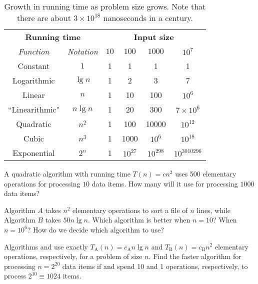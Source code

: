 \begin{table}[htb] 
   \centering
   \caption{Growth in running time as problem size grows. Note that 
   there are about $3\times 10^{18}$ nanoseconds in a century.}
   \label{t:growth}
   \begin{tabular}{|c|c|cccc|} \hline 
   \multicolumn{2}{|c|}{\textbf{Running time}} &  
   \multicolumn{4}{c|}{\textbf{Input size}} 
\\ \cline{1-6} 
   \emph{Function}     & \emph{Notation} & $10$ & $100$ & $1000$ & $10^7$
\\ \hline 
   Constant     & $1$      & 1  & 1  &   1 &   1 \\ \hline 
   Logarithmic  & $\lg n$ & 1  & 2& 3 & 7  \\ \hline 
   Linear       & $n$ & 1 & 10 & 100 & $10^6$   \\ \hline 
``Linearithmic" & $n  \lg n$ & 1 & 20 & 300 & $7\times 10^6$ \\ \hline 
   Quadratic    & $n^{2}$ & 1 & 100 & 10000 & $10^{12}$ \\ \hline 
   Cubic        & $n^{3}$ & 1 & 1000 & $10^6$ &  $10^{18}$ \\ \hline 
   Exponential  & $2^{n}$ & 1 & $10^{27}$ & $10^{298} $ & $10^{3010296}$  \\ \hline 
   \end{tabular}
\end{table} 
 



\begin{Boxample}[4]
\label{exr:time-compl:2}
A quadratic algorithm with running time \(T(n)=cn^2 \)
uses 500 elementary operations for processing $10$ data items. How many will it 
use for processing $1000$ data items? 
\end{Boxample}

\begin{Boxample}[4]
Algorithm $A$ takes $n^2$ elementary operations to sort a file of $n$ lines, while Algorithm $B$ takes $50n\lg n$. 
Which algorithm is better when $n = 10$? When $n=10^6$? How do we decide which algorithm to use?
\end{Boxample}

\begin{Boxample}[4]
\label{exr:time-compl:7A}
Algorithms  and  use exactly $T_\mathrm{A}(n) = c_\mathrm{A} n \lg n$
and $T_\mathrm{B}(n) = c_\mathrm{B} n^{2}$ elementary operations, respectively, for a problem of size $n$.
Find the faster algorithm for processing $n = 2^{20}$ data items if
 and  spend 10 and 1 operations, respectively, to process $2^{10} \equiv 1024$ items.
\end{Boxample}


